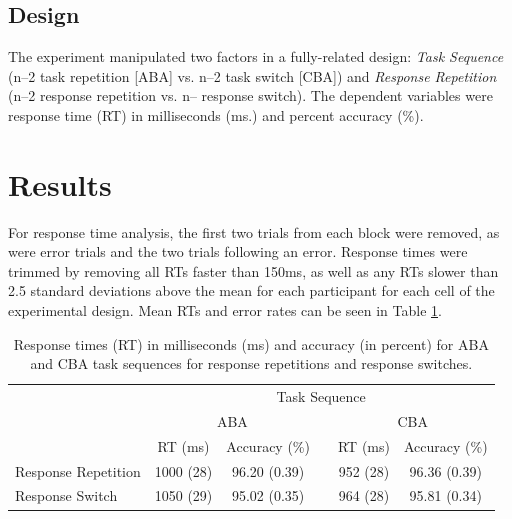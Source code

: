 \documentclass[a4paper, man, natbib]{apa6}
\begin{document}
\subsection{Design}
The experiment manipulated two factors in a fully-related design: \emph{Task Sequence} (n--2 task repetition [ABA] vs. n--2 task switch [CBA]) and \emph{Response Repetition} (n--2 response repetition vs. n-- response switch). The dependent variables were response time (RT) in milliseconds (ms.) and percent accuracy (\%).


\section{Results}
For response time analysis, the first two trials from each block were removed, as were error trials and the two trials following an error. Response times were trimmed by removing all RTs faster than 150ms, as well as any RTs slower than 2.5 standard deviations above the mean for each participant for each cell of the experimental design. Mean RTs and error rates can be seen in Table \ref{tab:behaviouralData}.

\begin{table}[htbp]
\centering
\caption{Response times (RT) in milliseconds (ms) and accuracy (in percent) for ABA and CBA task sequences for response repetitions and response switches.}
\label{my-label}
\begin{tabular}{lccccc}
\hline
                    & \multicolumn{5}{c}{Task Sequence}                       \\ \cline{2-6} 
                    & \multicolumn{2}{c}{ABA}   &  & \multicolumn{2}{c}{CBA}  \\ \cline{2-3} \cline{5-6} 
                    & RT (ms)   & Accuracy (\%) &  & RT (ms)  & Accuracy (\%) \\ \hline
Response Repetition & 1000 (28) & 96.20 (0.39)  &  & 952 (28) & 96.36 (0.39) \\
Response Switch     & 1050 (29) & 95.02 (0.35)  &  & 964 (28) & 95.81 (0.34) \\ \hline
\end{tabular}
\label{tab:behaviouralData}
\end{table}
\end{document}
